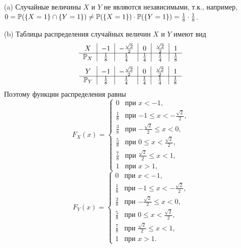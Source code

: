 \documentclass[12pt, a4paper]{article}\usepackage[]{graphicx}\usepackage[]{color}
\begin{document}
\begin{enumerate}
(a) Случайные величины $X$ и $Y$ не являются независимыми, т.к., например, $0 = \P(\{X=1\} \cap \{Y=1\}) \not= \P(\{X=1\}) \cdot \P(\{Y=1\}) = \frac{1}{8} \cdot \frac{1}{8}$.

(b) Таблицы распределения случайных величин $X$ и $Y$ имеют вид
\[
\begin{tabular}{c|c|c|c|c|c}
  $X$             & $-1$            & $-\frac{\sqrt{2}}{2}$     & $0$             & $\frac{\sqrt{2}}{2}$     & $1$    \\ \cline{1-6}
  $\P_X$  & $\frac{1}{8}$   & $\frac{1}{4}$             & $\frac{1}{4}$   & $\frac{1}{4}$            & $\frac{1}{8}$  \\
\end{tabular}
\]
\[
\begin{tabular}{c|c|c|c|c|c}
  $Y$             & $-1$            & $-\frac{\sqrt{2}}{2}$     & $0$             & $\frac{\sqrt{2}}{2}$     & $1$    \\ \cline{1-6}
  $\P_Y$  & $\frac{1}{8}$   & $\frac{1}{4}$             & $\frac{1}{4}$   & $\frac{1}{4}$            & $\frac{1}{8}$  \\
\end{tabular}
\]
Поэтому функции распределения равны
\[
F_X(x) =
                 \begin{cases}
                     0                           &   \text{при $x < -1$,} \\
                     \frac{1}{8}                 &   \text{при $-1 \leq x < -\frac{\sqrt{2}}{2}$,} \\
                     \frac{3}{8}                 &   \text{при $-\frac{\sqrt{2}}{2} \leq x < 0$,} \\
                     \frac{5}{8}                 &   \text{при $0 \leq x < \frac{\sqrt{2}}{2}$,} \\
                     \frac{7}{8}                 &   \text{при $\frac{\sqrt{2}}{2} \leq x < 1$,} \\
                     1                           &   \text{при $x > 1$,}
                  \end{cases}
\]
\[
F_Y(x) =
                 \begin{cases}
                     0                           &   \text{при $x < -1$,} \\
                     \frac{1}{8}                 &   \text{при $-1 \leq x < -\frac{\sqrt{2}}{2}$,} \\
                     \frac{3}{8}                 &   \text{при $-\frac{\sqrt{2}}{2} \leq x < 0$,} \\
                     \frac{5}{8}                 &   \text{при $0 \leq x < \frac{\sqrt{2}}{2}$,} \\
                     \frac{7}{8}                 &   \text{при $\frac{\sqrt{2}}{2} \leq x < 1$,} \\
                     1                           &   \text{при $x > 1$.}
                  \end{cases}
\]


\end{enumerate}
\end{document}
